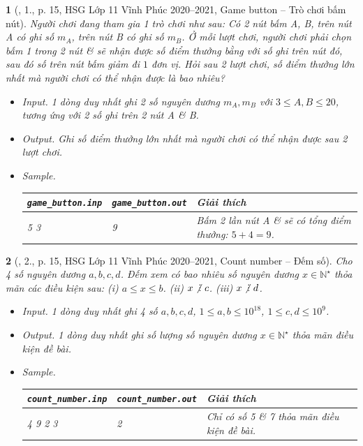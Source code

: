 \documentclass{article}
\newtheorem{baitoan}{}
\DeclareRobustCommand{\divby}{%
	\mathrel{\vbox{\baselineskip.65ex\lineskiplimit0pt\hbox{.}\hbox{.}\hbox{.}}}%
}
\begin{document}
\begin{baitoan}[\cite{Trung_HSG_THPT_Tin}, 1., p. 15, HSG Lớp 11 Vĩnh Phúc 2020--2021, Game button -- Trò chơi bấm nút]
	Người chơi đang tham gia 1 trò chơi như sau: Có 2 nút bấm A, B, trên nút A có ghi số $m_A$, trên nút B có ghi số $m_B$. Ở mỗi lượt chơi, người chơi phải chọn bấm 1 trong 2 nút \& sẽ nhận được số điểm thưởng bằng với số ghi trên nút đó, sau đó số trên nút bấm giảm đi $1$ đơn vị. Hỏi sau 2 lượt chơi, số điểm thưởng lớn nhất mà người chơi có thể nhận được là bao nhiêu?
	\begin{itemize}
		\item {\sf Input.} 1 dòng duy nhất ghi 2 số nguyên dương $m_A,m_B$ với $3\le A,B\le20$, tương ứng với 2 số ghi trên 2 nút A \& B.
		\item {\sf Output.} Ghi số điểm thưởng lớn nhất mà người chơi có thể nhận được sau 2 lượt chơi.
		\item {\sf Sample.}
		\begin{table}[H]
			\centering
			\begin{tabular}{|l|l|l|}
				\hline
				\verb|game_button.inp| & \verb|game_button.out| & Giải thích\\
				\hline
				5 3 & 9 & Bấm 2 lần nút A \& sẽ có tổng điểm thưởng: $5 + 4 = 9$. \\
				\hline
			\end{tabular}
		\end{table}
	\end{itemize}
\end{baitoan}

\begin{baitoan}[\cite{Trung_HSG_THPT_Tin}, 2., p. 15, HSG Lớp 11 Vĩnh Phúc 2020--2021, Count number -- Đếm số]
	Cho 4 số nguyên dương $a,b,c,d$. Đếm xem có bao nhiêu số nguyên dương $x\in\mathbb{N}^\star$ thỏa mãn các điều kiện sau: (i) $a\le x\le b$. (ii) $x\not{\divby}\ c$. (iii) $x\not{\divby}\ d$.
	\begin{itemize}
		\item {\sf Input.} 1 dòng duy nhất ghi 4 số $a,b,c,d$, $1\le a,b\le10^{18}$, $1\le c,d\le10^9$.
		\item {\sf Output.} 1 dòng duy nhất ghi số lượng số nguyên dương $x\in\mathbb{N}^\star$ thỏa mãn điều kiện đề bài.
		\item {\sf Sample.}
		\begin{table}[H]
			\centering
			\begin{tabular}{|l|l|l|}
				\hline
				\verb|count_number.inp| & \verb|count_number.out| & Giải thích \\
				\hline
				4 9 2 3 & 2 & Chỉ có số 5 \& 7 thỏa mãn điều kiện đề bài. \\
				\hline
			\end{tabular}
		\end{table}
	\end{itemize}
\end{baitoan}
\end{document}
